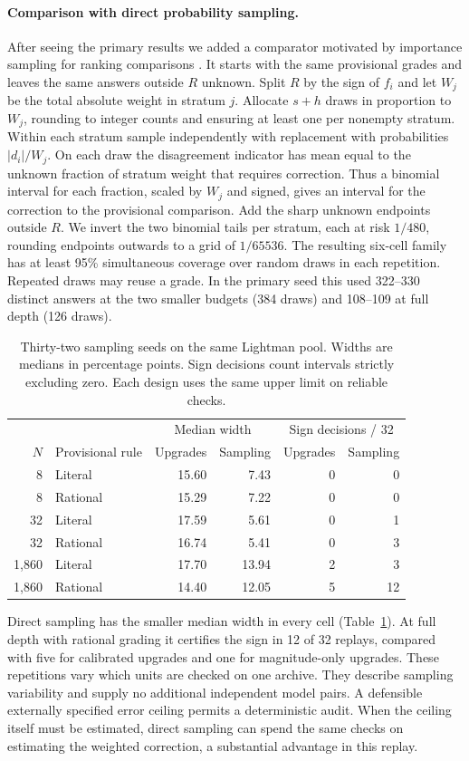 \paragraph{Comparison with direct probability sampling.}
After seeing the primary results we added a comparator motivated by importance sampling for ranking comparisons \cite{schnabel}. It starts with the same provisional grades and leaves the same answers outside $R$ unknown. Split $R$ by the sign of $f_i$ and let $W_j$ be the total absolute weight in stratum $j$. Allocate $s+h$ draws in proportion to $W_j$, rounding to integer counts and ensuring at least one per nonempty stratum. Within each stratum sample independently with replacement with probabilities $|d_i|/W_j$. On each draw the disagreement indicator has mean equal to the unknown fraction of stratum weight that requires correction. Thus a binomial interval for each fraction, scaled by $W_j$ and signed, gives an interval for the correction to the provisional comparison. Add the sharp unknown endpoints outside $R$. We invert the two binomial tails per stratum, each at risk $1/480$, rounding endpoints outwards to a grid of $1/65536$. The resulting six-cell family has at least 95\% simultaneous coverage over random draws in each repetition. Repeated draws may reuse a grade. In the primary seed this used 322--330 distinct answers at the two smaller budgets (384 draws) and 108--109 at full depth (126 draws).

\begin{table}[htbp]\centering\small
\caption{Thirty-two sampling seeds on the same Lightman pool. Widths are medians in percentage points. Sign decisions count intervals strictly excluding zero. Each design uses the same upper limit on reliable checks.}\label{tab:control}
\begin{tabular}{rlrrrr}\toprule
& & \multicolumn{2}{c}{Median width} & \multicolumn{2}{c}{Sign decisions / 32}\\
$N$ & Provisional rule & Upgrades & Sampling & Upgrades & Sampling\\\midrule
8 & Literal   & 15.60 & 7.43 & 0 & 0\\
8 & Rational  & 15.29 & 7.22 & 0 & 0\\
32 & Literal  & 17.59 & 5.61 & 0 & 1\\
32 & Rational & 16.74 & 5.41 & 0 & 3\\
1,860 & Literal & 17.70 & 13.94 & 2 & 3\\
1,860 & Rational & 14.40 & 12.05 & 5 & 12\\
\bottomrule\end{tabular}
\end{table}
Direct sampling has the smaller median width in every cell (Table~\ref{tab:control}). At full depth with rational grading it certifies the sign in 12 of 32 replays, compared with five for calibrated upgrades and one for magnitude-only upgrades. These repetitions vary which units are checked on one archive. They describe sampling variability and supply no additional independent model pairs. A defensible externally specified error ceiling permits a deterministic audit. When the ceiling itself must be estimated, direct sampling can spend the same checks on estimating the weighted correction, a substantial advantage in this replay.
